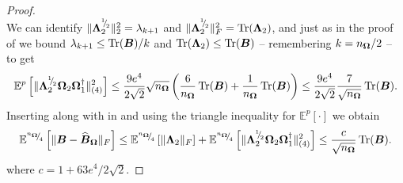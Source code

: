 \documentclass[12pt]{article}
\begin{document}
\begin{proof}
\begin{equation}
    \end{equation}
    We can identify $\lVert \boldsymbol{\Lambda}_2^{{}^{1}{\mskip -5mu/\mskip -3mu}_{2}} \rVert _2^2 = \lambda_{k+1}$ and $\lVert \boldsymbol{\Lambda}_2^{{}^{1}{\mskip -5mu/\mskip -3mu}_{2}} \rVert _F^2 = \operatorname{Tr}(\boldsymbol{\Lambda}_2)$, and just as in the proof of \cite[lemma 3.1]{meyer-2021-hutch-optimal} we bound $\lambda_{k+1} \leq \operatorname{Tr}(\boldsymbol{B})/k$ and $\operatorname{Tr}(\boldsymbol{\Lambda}_2) \leq \operatorname{Tr}(\boldsymbol{B})$ -- remembering $k = n_{\boldsymbol{\Omega}}/2$ -- to get 
    \begin{equation}
        \mathbb{E}^{p}\left[ \lVert \boldsymbol{\Lambda}_2^{{}^{1}{\mskip -5mu/\mskip -3mu}_{2}} \boldsymbol{\Omega}_2 \boldsymbol{\Omega}_1^{\dagger} \rVert _{(4)}^2 \right]
        \leq \frac{9 e^4}{2 \sqrt{2}}  \sqrt{n_{\boldsymbol{\Omega}}} \left( \frac{6}{n_{\boldsymbol{\Omega}}} \operatorname{Tr}(\boldsymbol{B}) + \frac{1}{n_{\boldsymbol{\Omega}}} \operatorname{Tr}(\boldsymbol{B}) \right)
        \leq \frac{9e^4}{2 \sqrt{2}} \frac{7}{\sqrt{n_{\boldsymbol{\Omega}}}} \operatorname{Tr}(\boldsymbol{B}).
        \label{equ:nystrom-proof-tail-bound}
    \end{equation}
    Inserting  along with  in  and using the triangle inequality for $\mathbb{E}^{p}[\cdot]$ we obtain
    \begin{equation}
        \mathbb{E}^{{}^{n_{\boldsymbol{\Omega}}}{\mskip -5mu/\mskip -3mu}_{4}} \left[\lVert \boldsymbol{B} - \widehat{\boldsymbol{B}}_{\boldsymbol{\Omega}} \rVert _F \right]
        \leq \mathbb{E}^{{}^{n_{\boldsymbol{\Omega}}}{\mskip -5mu/\mskip -3mu}_{4}} \left[ \lVert \boldsymbol{\Lambda}_2 \rVert _F \right] + \mathbb{E}^{{}^{n_{\boldsymbol{\Omega}}}{\mskip -5mu/\mskip -3mu}_{4}} \left[ \lVert \boldsymbol{\Lambda}_2^{{}^{1}{\mskip -5mu/\mskip -3mu}_{2}} \boldsymbol{\Omega}_2 \boldsymbol{\Omega}_1^{\dagger} \rVert _{(4)}^2 \right]
        \leq \frac{c}{\sqrt{n_{\boldsymbol{\Omega}}}} \operatorname{Tr}(\boldsymbol{B}).
    \end{equation}
    where $c = 1 + 63 e^4 / 2 \sqrt{2}$.


\end{proof}
\end{document}
